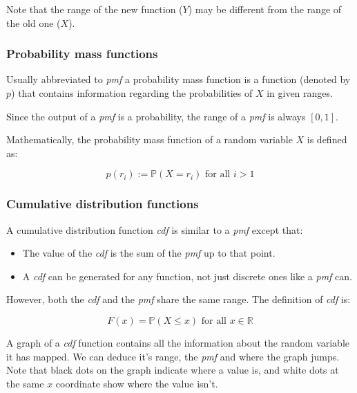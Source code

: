 Note that the range of the new function ($Y$) may be different from the range of
the old one ($X$).

\subsubsection{Probability mass functions}

Usually abbreviated to {\it pmf} a probability mass function is a function
(denoted by $p$) that contains information regarding the probabilities of $X$ in
given ranges.

Since the output of a {\it pmf} is a probability, the range of a {\it pmf} is
always $[0,1]$.

Mathematically, the probability mass function of a random variable $X$ is
defined as:

\begin{dmath*}
	p(r_i) := \mathbb{P}(X = r_i) \textrm{ for all $i > 1$}
\end{dmath*}


\subsubsection{Cumulative distribution functions}

A cumulative distribution function {\it cdf} is similar to a {\it pmf} except
that:

\begin{itemize}
	\item The value of the {\it cdf} is the sum of the {\it pmf} up to that 
	point.
	\item A {\it cdf} can be generated for any function, not just discrete ones
	like a {\it pmf} can.
\end{itemize}

However, both the {\it cdf} and the {\it pmf} share the same range. The
definition of {\it cdf} is:

\begin{dmath*}
	{F(x) = \mathbb{P}(X \leq x)} \textrm{ for all $x \in \mathbb{R}$}
\end{dmath*}

A graph of a {\it cdf} function contains all the information about the random
variable it has mapped. We can deduce it's range, the {\it pmf} and where the
graph jumps. Note that black dots on the graph indicate where a value is, and
white dots at the same $x$ coordinate show where the value isn't.

